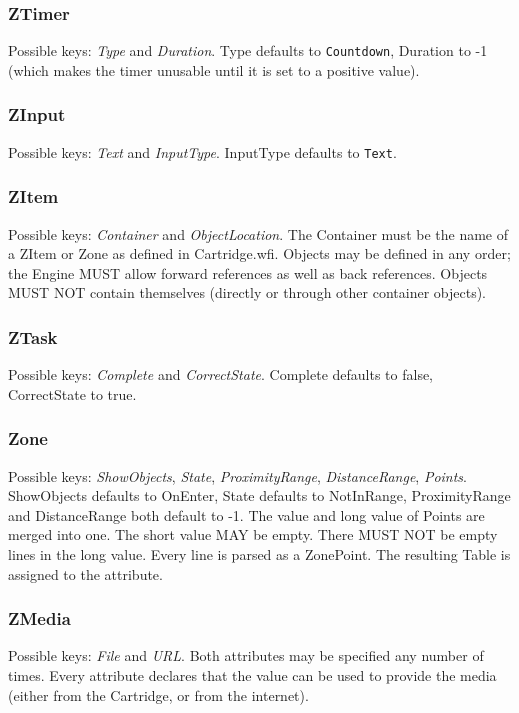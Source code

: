 \documentclass{article}
\begin{document}
\subsubsection{ZTimer}
Possible keys: \textit{Type} and \textit{Duration}.  Type defaults to \texttt{Countdown}, Duration to -1 (which makes the timer unusable until it is set to a positive value).

\subsubsection{ZInput}
Possible keys: \textit{Text} and \textit{InputType}.  InputType defaults to \texttt{Text}.

\subsubsection{ZItem}
Possible keys: \textit{Container} and \textit{ObjectLocation}.  The Container must be the name of a ZItem or Zone as defined in Cartridge.wfi.  Objects may be defined in any order; the Engine MUST allow forward references as well as back references.  Objects MUST NOT contain themselves (directly or through other container objects).

\subsubsection{ZTask}
Possible keys: \textit{Complete} and \textit{CorrectState}.  Complete defaults to false, CorrectState to true.

\subsubsection{Zone}
Possible keys: \textit{ShowObjects}, \textit{State}, \textit{ProximityRange}, \textit{DistanceRange}, \textit{Points}.  ShowObjects defaults to OnEnter, State defaults to NotInRange, ProximityRange and DistanceRange both default to -1.  The value and long value of Points are merged into one.  The short value MAY be empty.  There MUST NOT be empty lines in the long value.  Every line is parsed as a ZonePoint.  The resulting Table is assigned to the attribute.

\subsubsection{ZMedia}
Possible keys: \textit{File} and \textit{URL}.  Both attributes may be specified any number of times.  Every attribute declares that the value can be used to provide the media (either from the Cartridge, or from the internet).
\end{document}

